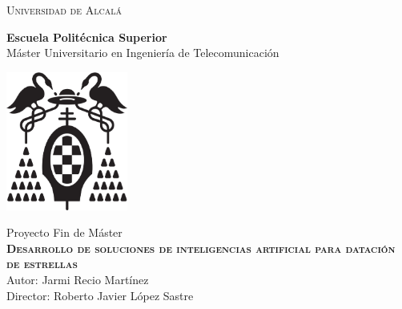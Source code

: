 
\begin{center}
\LARGE \textsc{Universidad de Alcalá}\\
\vspace{0.5cm}

\textbf{Escuela Politécnica Superior}\\

Máster Universitario en Ingeniería de Telecomunicación\\
\end{center}

\vspace{0.5cm}

\begin{center}
\includegraphics[width=4cm]{Figuras/LogoUAH.eps}\\
\end{center}


\begin{center}
\vspace{1cm}

\LARGE Proyecto Fin de Máster\\
\textbf{\Huge \textsc{{Desarrollo de soluciones de inteligencias artificial para datación de estrellas}}}\\
\vspace{0.5cm}
\large Autor: Jarmi Recio Martínez\\
Director: Roberto Javier López Sastre\\
\vspace{0.5cm}
\end{center}

